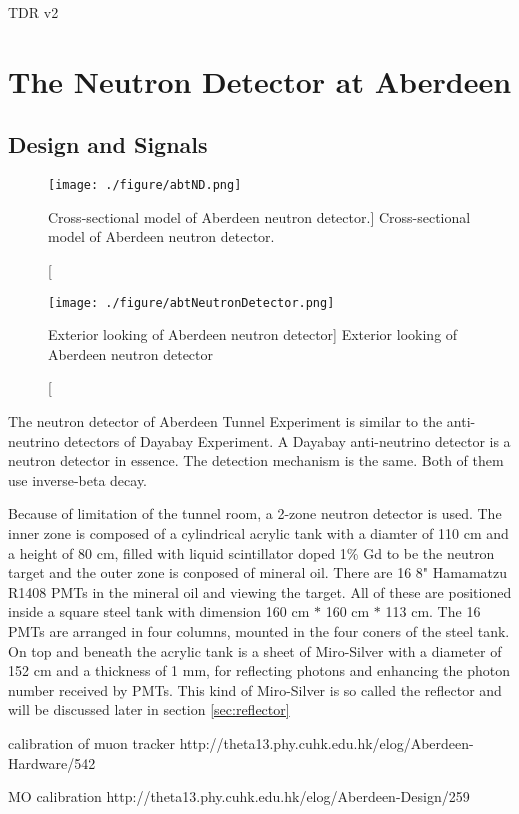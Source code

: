 TDR v2




\section{The Neutron Detector at Aberdeen}
\label{sec:ND}
\subsection{Design and Signals}


\begin{figure}[h]
    \centering
    \texttt{[image: ./figure/abtND.png]}
    \caption
    [Cross-sectional model of Aberdeen neutron detector.]
    {Cross-sectional model of Aberdeen neutron detector.}
    \label{fig:abtND.png}
    \end{figure}

\begin{figure}[h]
    \centering
    \texttt{[image: ./figure/abtNeutronDetector.png]}
    \caption
    [Exterior looking of Aberdeen neutron detector]
    {Exterior looking of Aberdeen neutron detector}
    \label{fig:abtNeutronDetector.png}
    \end{figure}








The neutron detector of Aberdeen Tunnel Experiment is similar to the
anti-neutrino detectors of Dayabay Experiment. A Dayabay anti-neutrino
detector is a neutron detector in essence. The detection mechanism is the same.
Both of them use inverse-beta decay.

Because of limitation of the tunnel room, a 2-zone neutron detector is used. The inner zone
is composed of a cylindrical acrylic tank with a diamter of 110 cm and a height of 80 cm, filled with liquid scintillator doped 1\% Gd to be the neutron target and
the outer zone is conposed of mineral oil. There are 16 8" Hamamatzu R1408 PMTs in the mineral oil and viewing the target.
All of these are positioned inside a square steel tank with dimension 160 cm $*$ 160 cm $*$ 113 cm. The 16 PMTs
are arranged in four columns, mounted in the four coners of the steel tank. On top and beneath the acrylic tank is
a sheet of Miro-Silver with a diameter of 152 cm and a thickness of 1 mm, for reflecting photons and
enhancing the photon number received by PMTs. This kind of Miro-Silver is so called the reflector and will
be discussed later in section \ref{sec:reflector}


calibration of muon tracker
http://theta13.phy.cuhk.edu.hk/elog/Aberdeen-Hardware/542

MO calibration
http://theta13.phy.cuhk.edu.hk/elog/Aberdeen-Design/259

